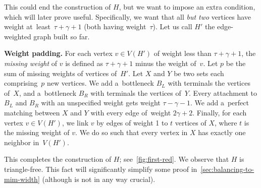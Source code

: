 \documentclass[a4paper,UKenglish,cleveref,hyperref,autoref]{lipics-v2021}
\begin{document}
\medskip

This could end the construction of $H$, but we want to impose an extra condition, which will later prove useful.
Specifically, we want that all \emph{but two} vertices have weight at~least~$\tau + \gamma + 1$ (both having weight~$\tau$).
Let us call $H'$ the edge-weighted graph built so far. 

\medskip

\textbf{Weight padding.}
For each vertex $v \in V(H')$ of weight less than $\tau + \gamma + 1$, the \emph{missing weight} of $v$ is defined as $\tau + \gamma + 1$ minus the weight of~$v$.
Let $p$ be the sum of missing weights of vertices of~$H'$.
Let $X$ and $Y$ be two sets each comprising~$p$ new vertices.
We add a~bottleneck $B_L$ with terminals the vertices of~$X$, and a~bottleneck $B_R$ with terminals the vertices of~$Y$.
Every attachment to $B_L$ and $B_R$ with an unspecified weight gets weight $\tau - \gamma - 1$.
We add a~perfect matching between $X$ and $Y$ with every edge of~weight $2 \gamma + 2$.
Finally, for each vertex $v \in V(H')$, we link $v$ by edges of weight 1 to $t$ vertices of $X$, where $t$ is the missing weight of $v$.
We do so such that every vertex in $X$ has exactly one neighbor in~$V(H')$.

This completes the construction of $H$; see~\cref{fig:first-red}.
We observe that $H$ is triangle-free.
This fact will significantly simplify some proof in~\cref{sec:balancing-to-mim-width} (although is not in any way crucial).
\end{document}
